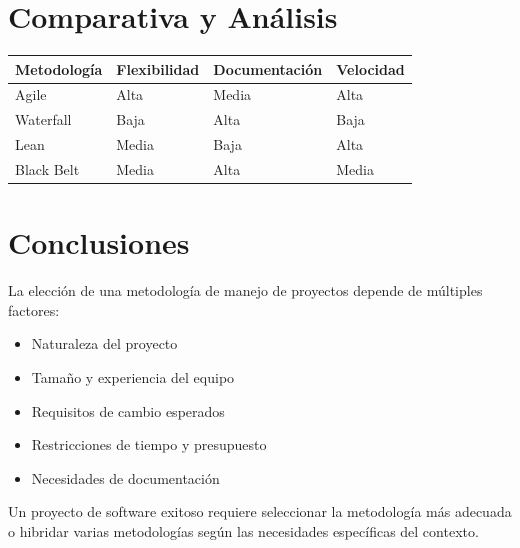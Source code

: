 \documentclass[12pt, a4paper]{article}
\begin{document}
\section{Comparativa y Análisis}

\begin{table}[h]
\centering
\begin{tabular}{|l|l|l|l|}
\hline
\textbf{Metodología} & \textbf{Flexibilidad} & \textbf{Documentación} & \textbf{Velocidad} \\
\hline
Agile & Alta & Media & Alta \\
\hline
Waterfall & Baja & Alta & Baja \\
\hline
Lean & Media & Baja & Alta \\
\hline
Black Belt & Media & Alta & Media \\
\hline
\end{tabular}
\end{table}

\section{Conclusiones}

La elección de una metodología de manejo de proyectos depende de múltiples factores:
\begin{itemize}
    \item Naturaleza del proyecto
    \item Tamaño y experiencia del equipo
    \item Requisitos de cambio esperados
    \item Restricciones de tiempo y presupuesto
    \item Necesidades de documentación
\end{itemize}

Un proyecto de software exitoso requiere seleccionar la metodología más adecuada o hibridar varias metodologías según las necesidades específicas del contexto.
\end{document}
